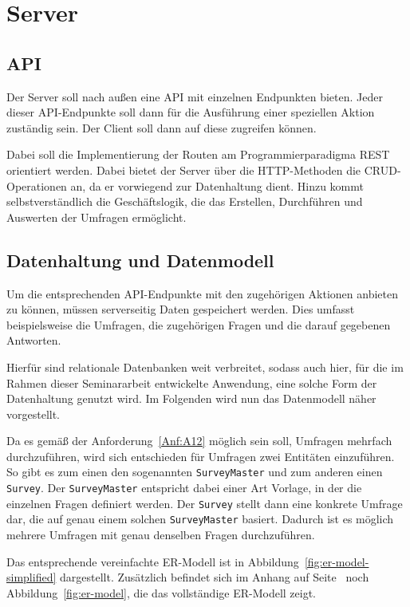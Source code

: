 \section{Server}

\subsection{\acl{API}}
Der Server soll nach außen eine \acs{API} mit einzelnen Endpunkten bieten.
Jeder dieser \acs{API}-Endpunkte soll dann für die Ausführung einer speziellen Aktion zuständig sein.
Der Client soll dann auf diese zugreifen können.

Dabei soll die Implementierung der Routen am Programmierparadigma \acs{REST} orientiert werden.
Dabei bietet der Server über die \acs{HTTP}-Methoden die \acs{CRUD}-Operationen an, da er vorwiegend zur Datenhaltung dient.
Hinzu kommt selbstverständlich die Geschäftslogik, die das Erstellen, Durchführen und Auswerten der Umfragen ermöglicht.

\subsection{Datenhaltung und Datenmodell}
Um die entsprechenden \acs{API}-Endpunkte mit den zugehörigen Aktionen anbieten zu können, müssen serverseitig Daten gespeichert werden.
Dies umfasst beispielsweise die Umfragen, die zugehörigen Fragen und die darauf gegebenen Antworten.

Hierfür sind relationale Datenbanken weit verbreitet, sodass auch hier, für die im Rahmen dieser Seminararbeit entwickelte Anwendung, eine solche Form der Datenhaltung genutzt wird.
Im Folgenden wird nun das Datenmodell näher vorgestellt.

Da es gemäß der Anforderung~\ref{Anf:A12} möglich sein soll, Umfragen mehrfach durchzuführen, wird sich entschieden für Umfragen zwei Entitäten einzuführen.
So gibt es zum einen den sogenannten \texttt{SurveyMaster} und zum anderen einen \texttt{Survey}.
Der \texttt{SurveyMaster} entspricht dabei einer Art Vorlage, in der die einzelnen Fragen definiert werden.
Der \texttt{Survey} stellt dann eine konkrete Umfrage dar, die auf genau einem solchen \texttt{SurveyMaster} basiert.
Dadurch ist es möglich mehrere Umfragen mit genau denselben Fragen durchzuführen.

Das entsprechende vereinfachte \acs{ER-Modell} ist in Abbildung~\vref{fig:er-model-simplified} dargestellt.
Zusätzlich befindet sich im Anhang auf Seite~\pageref{fig:er-model} noch Abbildung~\ref{fig:er-model}, die das vollständige \acs{ER-Modell} zeigt.

